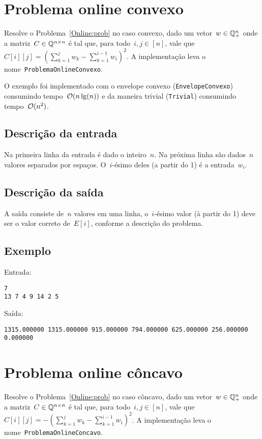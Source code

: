 \section{Problema online convexo} \label{ProblemaOnlineConvexo}

Resolve o Problema~\ref{Online:prob} no caso convexo, dado um vetor~$w \in \mathbb{Q}^n_+$ onde a matriz~$C \in \mathbb{Q}^{n \times n}$ é tal que, para todo~$i,j\in[n]$, vale que~$C[i][j] = (\sum_{k=1}^j w_k - \sum_{k=1}^{i-1} w_i)^2$. A implementação leva o nome~\texttt{ProblemaOnlineConvexo}.

O exemplo foi implementado com o envelope convexo (\texttt{EnvelopeConvexo}) consumindo tempo~$\mathcal{O}(n\lg(n))$ e da maneira trivial (\texttt{Trivial}) consumindo tempo~$\mathcal{O}(n^2)$.

\subsection*{Descrição da entrada}
Na primeira linha da entrada é dado o inteiro~$n$. Na próxima linha são dados~$n$ valores separados por espaços. O~$i$-ésimo deles (a partir do 1) é a entrada~$w_i$.

\subsection*{Descrição da saída}
A saída consiste de~$n$ valores em uma linha, o~$i$-ésimo valor (à partir do 1) deve ser o valor correto de~$E[i]$, conforme a descrição do problema.

\subsection*{Exemplo}
Entrada:
\begin{verbatim}
7
13 7 4 9 14 2 5
\end{verbatim}
Saída:
\begin{verbatim}
1315.000000 1315.000000 915.000000 794.000000 625.000000 256.000000 0.000000
\end{verbatim}


\section{Problema online côncavo} \label{ProblemaOnlineConcavo}

Resolve o Problema~\ref{Online:prob} no caso côncavo, dado um vetor~$w \in \mathbb{Q}^n_+$ onde a matriz~$C \in \mathbb{Q}^{n \times n}$ é tal que, para todo~$i,j\in[n]$, vale que~$C[i][j] = -(\sum_{k=1}^j w_k - \sum_{k=1}^{i-1} w_i)^2$. A implementação leva o nome~\texttt{ProblemaOnlineConcavo}.


